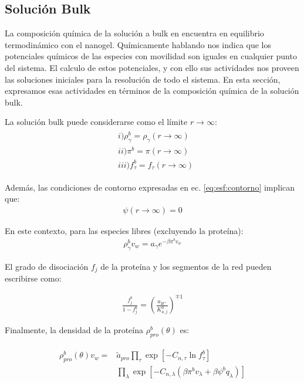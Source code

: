 \subsection{Soluci\'on Bulk}\label{sec:esf:bulk}

La composici\'on qu\'imica de la soluci\'on a bulk en encuentra en equilibrio termodin\'amico con el nanogel. Qu\'imicamente hablando nos indica que los potenciales qu\'imicos de las especies con movilidad son iguales en cualquier punto del sistema. 
El calculo de estos potenciales, y con ello sus actividades nos proveen  las soluciones iniciales para la resoluci\'on de todo el sistema.
En esta secci\'on, expresamos esas actividades en t\'erminos de la composici\'on qu\'imica de la soluci\'on bulk.

La soluci\'on bulk  puede considerarse como el límite $r \rightarrow \infty$:
\begin{align}
	\begin{aligned}
		& i)\rho^b_\gamma =\rho_\gamma (r \rightarrow \infty) \\
		& ii) \pi^b = \pi(r \rightarrow \infty) \\
		& iii) f_\tau^b = f_\tau(r \rightarrow \infty)
	\end{aligned}
\end{align}

Adem\'as, las condiciones de contorno expresadas en ec. \ref{eq:esf:contorno} implican que:
\begin{align}
	\psi(r \rightarrow \infty) = 0
\end{align}

En este contexto, para las especies libres (excluyendo la prote\'ina):
\begin{align}
	\rho_\gamma^b v_w = a_\gamma e^{-\beta\pi^bv_w}
	\label{eq:esf:free-bulk}
\end{align}

El grado de disociaci\'on $f_j$ de la prote\'ina y los segmentos de la red pueden escribirse como:

\begin{align}
	\frac{f_j^b}{1-f_j^b} = \left(\frac{a_{H^+}}{K^0_{a,j}}\right)^{\mp 1}
\end{align}

Finalmente, la densidad de la prote\'ina $\rho_{pro}^b(\theta)$ es:

\begin{align}
	\begin{aligned}
		\rho^b_{pro}(\theta)v_w = &\tilde{a}_{pro} \prod_\tau\exp\left[-C_{n,\tau} \ln f^b_\tau\right] \\
		&\prod_\lambda \exp \left[-C_{n,\lambda} (\beta\pi^b v_\lambda + \beta\psi^b q_\lambda ) \right]
	\end{aligned}
	\label{eq:esf:bulk-protein}
\end{align}

